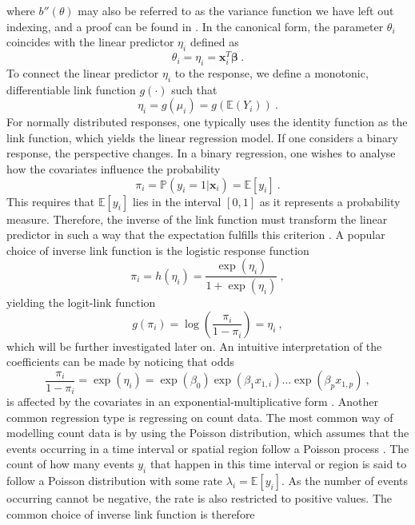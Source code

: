 where $b''(\theta)$ may also be referred to as the variance function \citep{GLMM_book} we have left out indexing, and a proof can be found in .
In the canonical form, the parameter $\theta_{i}$ coincides with the linear predictor $\eta_{i}$ defined as 
\begin{equation}
    \theta_{i} = \eta_{i} = \mathbf{x}_{i}^T\boldsymbol{\beta}  \ . %
\end{equation}
To connect the linear predictor $\eta_{i}$ to the response, we define a monotonic, differentiable link function $g(\cdot)$ such that
\begin{equation}
    \eta_{i} = g(\mu_{i}) = g(\mathbb{E}(Y_{i}))\ .
\end{equation} 
For normally distributed responses, one typically uses the identity function as the link function, which yields the linear regression model. If one considers a binary response, the perspective changes. In a binary regression, one wishes to analyse how the covariates influence the probability 
\begin{equation}
    \pi_i = \mathbb{P}(y_i = 1 \lvert \mathbf{x}_i) = \mathbb{E}[y_i] \ .
\end{equation}
This requires that $\mathbb{E}[y_i]$ lies in the interval $[0, 1]$ as it represents a probability measure. Therefore, the inverse of the link function must transform the linear predictor in such a way that the expectation fulfills this criterion \citep{GLMM_book}. A popular choice of inverse link function is the logistic response function 
\begin{equation}
    \pi_i = h(\eta_i) = \frac{\exp(\eta_i)}{1 + \exp(\eta_i)} \ , 
\end{equation} 
yielding the logit-link function
\begin{equation}
    g(\pi_i) = \log\left(\frac{\pi_i}{1-\pi_i}\right) = \eta_i \ ,
\end{equation}
which will be further investigated later on. An intuitive interpretation of the coefficients can be made by noticing that odds
\begin{equation}
    \frac{\pi_i}{1-\pi_i} = \exp(\eta_i) = \exp(\beta_0)\exp(\beta_1x_{1, i})...\exp(\beta_px_{1, p}) \ ,
\end{equation}
is affected by the covariates in an exponential-multiplicative form \citep{GLMM_book}. Another common regression type is regressing on count data. The most common way of modelling count data is by using the Poisson distribution, which assumes that the events occurring in a time interval or spatial region follow a Poisson process \citep{GLMM_book_old}. The count of how many events $y_i$ that happen in this time interval or region is said to follow a Poisson distribution with some rate $\lambda_i = \mathbb{E}[y_i]$. As the number of events occurring cannot be negative, the rate is also restricted to positive values. The common choice of inverse link function is therefore 
